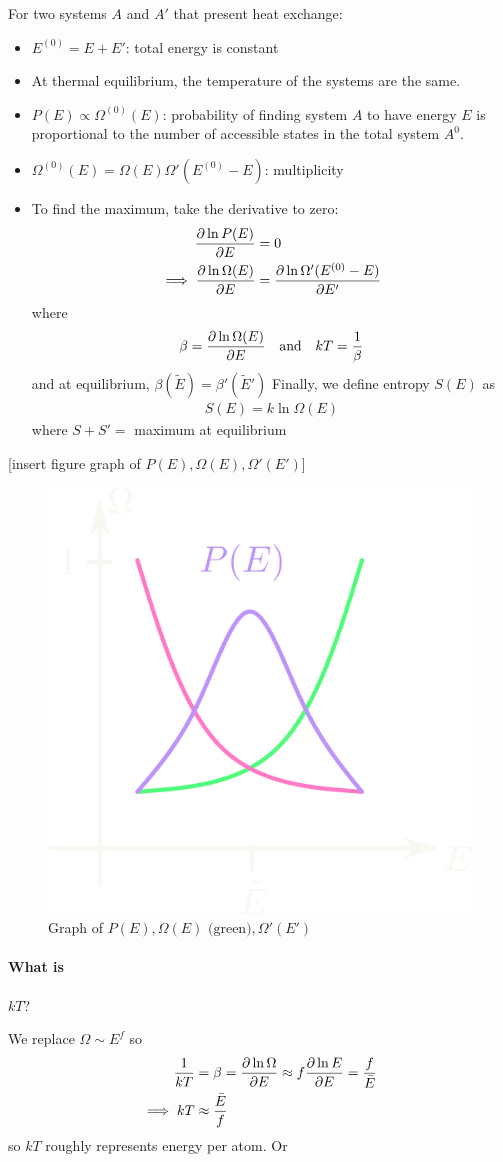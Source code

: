 \documentclass[../main.tex]{subfiles}
\begin{document}
For two systems $A$ and $A'$ that present heat exchange:
\begin{itemize}
    \item $E^{(0)} = E + E'$: total energy is constant
    \item At thermal equilibrium, the temperature of the systems are the same.
    \item $P(E) \propto \Omega^{(0)}(E)$: probability of finding system $A$ to have energy $E$ is proportional to the number of accessible states in the total system $A^{0}$.
    \item $\Omega^{(0)}(E) = \Omega(E) \Omega'(E^{(0)} - E)$: multiplicity
    \item To find the maximum, take the derivative to zero:
    \begin{align*}
        \pdv{\ln P(E)}{E} &= 0 \\
        \implies \pdv{\ln \Omega(E)}{E} &= \pdv{\ln \Omega'(E^{(0)} - E)}{E'}
    \end{align*}
    where
    \begin{align*}
        \beta = \pdv{\ln \Omega(E)}{E} \quad \textrm{and} \quad kT = \frac{1}{\beta}
    \end{align*}
    and at equilibrium, $\beta(\tilde E) = \beta'(\tilde E')$
    Finally, we define entropy $S(E)$ as
    \begin{align*}
        S(E) = k \ln \Omega(E)
    \end{align*}
    where $S + S' =$ maximum at equilibrium
\end{itemize}
[insert figure graph of $P(E), \Omega(E), \Omega'(E')$]
\begin{figure}[ht]
    \centering
    \includegraphics[width=0.3\linewidth]{fig3_1.png}
    \caption{Graph of $P(E), \Omega(E) \textrm{ (green)}, \Omega'(E')$}
    \label{fig:lecture3_1}
\end{figure}
\paragraph*{What is} $kT$?

We replace $\Omega \sim E^f$ so
\begin{align*}
    \frac{1}{kT} &= \beta = \pdv{\ln \Omega}{E} \approx f \pdv{\ln E}{E} = \frac{f}{\bar E} \\
    \implies kT &\approx \frac{\bar E}{f}
\end{align*}
so $kT$ roughly represents energy per atom. Or
\end{document}
